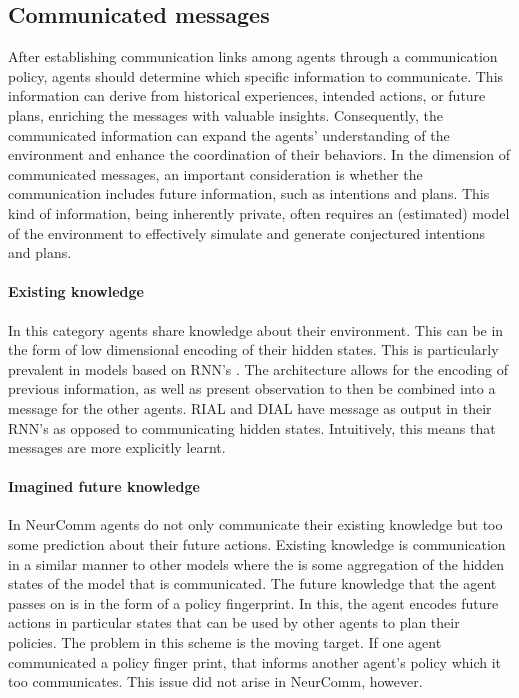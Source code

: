 \documentclass{article}
\begin{document}
\subsection{Communicated messages}

After establishing communication links among agents through a communication policy, agents should determine which specific information to communicate. This information can derive from historical experiences, intended actions, or future plans, enriching the messages with valuable insights. Consequently, the communicated information can expand the agents’ understanding of the environment and enhance the coordination of their behaviors. In the dimension of communicated messages, an important consideration is whether the communication includes future information, such as intentions and plans. This kind of information, being inherently private, often requires an (estimated) model of the environment to effectively simulate and generate conjectured intentions and plans.

\paragraph{Existing knowledge} In this category agents share knowledge about their environment. This can be in the form of low dimensional encoding of their hidden states. This is particularly prevalent in models based on RNN's \citep{sukhbaatar2016commnet, peng2017bicnet, singh2018ic3net}. The architecture allows for the encoding of previous information, as well as present observation to then be combined into a message for the other agents. RIAL and DIAL \citep{foerster2016learning} have message as output in their RNN's as opposed to communicating hidden states. Intuitively, this means that messages are more explicitly learnt.

\paragraph{Imagined future knowledge} In NeurComm \citep{chu2020NeurComm} agents do not only communicate their existing knowledge but too some prediction about their future actions. Existing knowledge is communication in a similar manner to other models where the is some aggregation of the hidden states of the model that is communicated. The future knowledge that the agent passes on is in the form of a policy fingerprint. In this, the agent encodes future actions in particular states that can be used by other agents to plan their policies. The problem in this scheme is the moving target. If one agent communicated a policy finger print, that informs another agent's policy which it too communicates. This issue did not arise in NeurComm, however.
\end{document}

